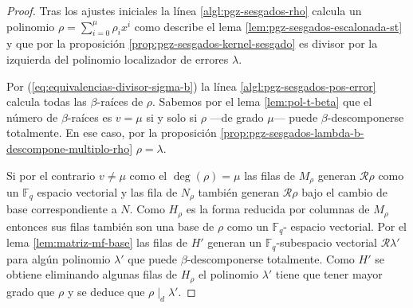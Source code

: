 \begin{proof}
  Tras los ajustes iniciales la línea \ref{algl:pgz-sesgados-rho} calcula un polinomio \(\rho = \sum_{i = 0}^{\mu}\rho_ix^{i}\) como describe el lema \ref{lem:pgz-sesgados-escalonada-st} y que por la proposición \ref{prop:pgz-sesgados-kernel-sesgado} es divisor por la izquierda del polinomio localizador de errores \(\lambda\).
  
  Por (\ref{eq:equivalencias-divisor-sigma-b}) la línea \ref{algl:pgz-sesgados-pos-error} calcula todas las \(\beta\)-raíces de \(\rho\).
  Sabemos por el lema \ref{lem:pol-t-beta} que el número de \(\beta\)-raíces es \(v = \mu\) si y solo si \(\rho\) —de grado \(\mu\)— puede \(\beta\)-descomponerse totalmente.
  En ese caso, por la proposición \ref{prop:pgz-sesgados-lambda-b-descompone-multiplo-rho} \(\rho = \lambda\).
  
  Si por el contrario \(v \neq \mu\) como el \(\deg(\rho) = \mu\) las filas de \(M_{\rho}\) generan \(\mathcal R\rho\) como un \(\mathbb F_q\) espacio vectorial y las fila de \(N_{\rho}\) también generan \(\mathcal R\rho\) bajo el cambio de base correspondiente a \(N\).
  Como \(H_{\rho}\) es la forma reducida por columnas de \(M_{\rho}\) entonces sus filas también son una base de \(\mathcal \rho\) como un \(\mathbb F_q\)- espacio vectorial.
  Por el lema \ref{lem:matriz-mf-base} las filas de \(H'\) generan un \(\mathbb F_q\)-subespacio vectorial \(\mathcal R\lambda'\) para algún polinomio \(\lambda'\) que puede \(\beta\)-descomponerse totalmente.
  Como \(H'\) se obtiene eliminando algunas filas de \(H_{\rho}\) el polinomio \(\lambda'\) tiene que tener mayor grado que \(\rho\) y se deduce que \(\rho \mid_d \lambda'\).


\end{proof}
